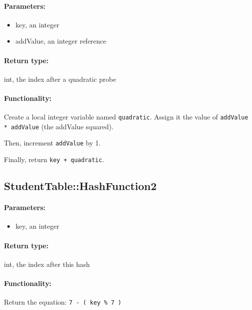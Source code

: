 \documentclass[a4paper,12pt,oneside]{book}
\begin{document}
\paragraph{Parameters:}

\begin{itemize}
    \item   key, an integer
    \item   addValue, an integer reference
\end{itemize}

\paragraph{Return type:} int, the index after a quadratic probe

\paragraph{Functionality:}
Create a local integer variable named \texttt{quadratic}. Assign it
the value of \texttt{addValue * addValue} (the addValue squared).

Then, increment \texttt{addValue} by 1.

Finally, return \texttt{key + quadratic}.

\hrulefill

\subsection{StudentTable::HashFunction2}

\paragraph{Parameters:}

\begin{itemize}
    \item   key, an integer
\end{itemize}

\paragraph{Return type:} int, the index after this hash   

\paragraph{Functionality:}

Return the equation: \texttt{7 - ( key \% 7 )}
\end{document}
